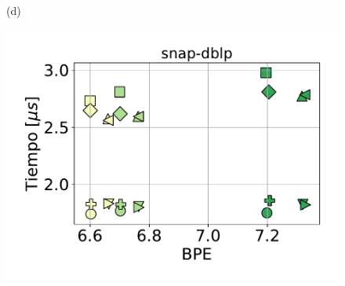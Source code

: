 \begin{figure}
\begin{minipage}{1\textwidth}
\begin{minipage}{0.45\textwidth}
    			(d)
    		\end{minipage}  
    	\end{minipage}
    	
    	\begin{minipage}{1\textwidth}
    		\centering
    		\begin{minipage}{0.45\textwidth}
    			\centering
    			\begin{minipage}{0.70\textwidth}
    				\centering
    				\includegraphics[width=1\linewidth]{img/sdsl/secuencial/snap-dblp.pdf}
    			\end{minipage}
    			\begin{minipage}{0.25\textwidth}
    				\centering

\end{minipage}
\end{minipage}
\end{minipage}
\end{figure}
